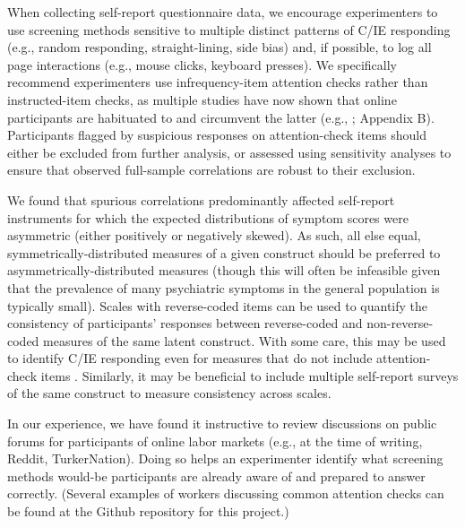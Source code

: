 \documentclass[a4paper,notitlepage,12pt]{article}
\begin{document}
When collecting self-report questionnaire data, we encourage experimenters to use screening methods sensitive to multiple distinct patterns of C/IE responding (e.g., random responding, straight-lining, side bias) and, if possible, to log all page interactions (e.g., mouse clicks, keyboard presses). We specifically recommend experimenters use infrequency-item attention checks rather than instructed-item checks, as multiple studies have now shown that online participants are habituated to and circumvent the latter (e.g., \cite{barends2019noncompliant, thomas2017validity, hauser2016attentive}; Appendix B). Participants flagged by suspicious responses on attention-check items should either be excluded from further analysis, or assessed using sensitivity analyses to ensure that observed full-sample correlations are robust to their exclusion.

We found that spurious correlations predominantly affected self-report instruments for which the expected distributions of symptom scores were asymmetric (either positively or negatively skewed). As such, all else equal, symmetrically-distributed measures of a given construct should be preferred to asymmetrically-distributed measures (though this will often be infeasible given that the prevalence of many psychiatric symptoms in the general population is typically small). Scales with reverse-coded items can be used to quantify the consistency of participants' responses between reverse-coded and non-reverse-coded measures of the same latent construct. With some care, this may be used to identify C/IE responding even for measures that do not include attention-check items \cite{emons2009detection}. Similarly, it may be beneficial to include multiple self-report surveys of the same construct to measure consistency across scales.
    
In our experience, we have found it instructive to review discussions on public forums for participants of online labor markets (e.g., at the time of writing, Reddit, TurkerNation). Doing so helps an experimenter identify what screening methods would-be participants are already aware of and prepared to answer correctly. (Several examples of workers discussing common attention checks can be found at the Github repository for this project.)
\end{document}
